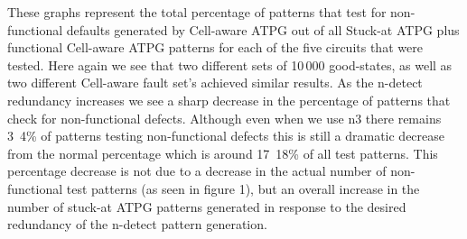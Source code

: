 \documentclass[12pt]{article}
\begin{document}
These graphs represent the total percentage of patterns that test for non-functional defaults generated by Cell-aware ATPG out of all Stuck-at ATPG plus functional Cell-aware ATPG patterns for each of the five circuits that were tested. Here again we see that two different sets of 10\,000 good-states, as well as two different Cell-aware fault set's achieved similar results. As the n-detect redundancy increases we see a sharp decrease in the percentage of patterns that check for non-functional defects. Although even when we use n3 there remains 3~4\% of patterns testing non-functional defects this is still a dramatic decrease from the normal percentage which is around 17~18\% of all test patterns. This percentage decrease is not due to a decrease in the actual number of non-functional test patterns (as seen in figure 1), but an overall increase in the number of stuck-at ATPG patterns generated in response to the desired redundancy of the n-detect pattern generation. 
\end{document}

